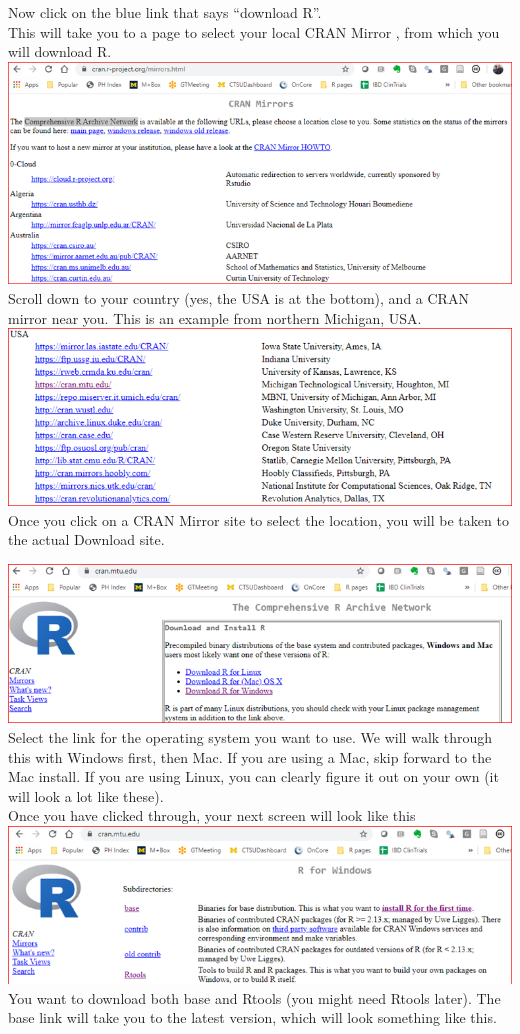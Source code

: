 \documentclass[
]{book}
\begin{document}
Now click on the blue link that says ``download R''.\\
This will take you to a page to select your local CRAN Mirror , from which you will download R.
\includegraphics{images/cran-mirror.png}
Scroll down to your country (yes, the USA is at the bottom), and a CRAN mirror near you.
This is an example from northern Michigan, USA.
\includegraphics{images/usa-mirrors.png}
Once you click on a CRAN Mirror site to select the location, you will be taken to the actual Download site.

\includegraphics{images/installr.png}
Select the link for the operating system you want to use. We will walk through this with Windows first, then Mac. If you are using a Mac, skip forward to the Mac install. If you are using Linux, you can clearly figure it out on your own (it will look a lot like these).\\
Once you have clicked through, your next screen will look like this\\
\includegraphics{images/installr2.png}
You want to download both base and Rtools (you might need Rtools later). The base link will take you to the latest version, which will look something like this.
\end{document}
